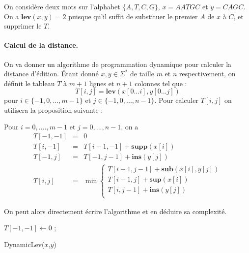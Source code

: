 \begin{example}[ADN]
On considère deux mots sur l'alphabet $\{A,T,C,G\}$, $x=AATGC$ et $y=CAGC$. On a $\mathbf{lev}(x,y)=2$ puisque qu'il suffit de substituer le premier $A$ de $x$ à $C$, et supprimer le $T$.
\end{example}


\paragraph{Calcul de la distance.}

On va donner un algorithme de programmation dynamique pour calculer la distance d'édition. Étant donné $x,y \in \Sigma^*$ de taille $m$ et $n$ respectivement, on définit le tableau $T$ à $m+1$ lignes et $n+1$ colonnes tel que :
$$
T[i,j] = \mathbf{lev}(x[0...i],y[0...j])
$$
pour $i \in \{-1,0,...,m-1\}$ et $j\in\{-1,0,...,n-1\}$. Pour calculer $T[i,j]$ on utilisera la proposition suivante :

\begin{proposition}\label{prop1}
Pour $i=0,....,m-1$ et $j=0,...,n-1$, on a 
$$
\begin{array}{lll}
T[-1,-1] &= &0  \\
T[i,-1] &= &T[i-1,-1] + \mathbf{supp}(x[i]) \\
T[-1,j] &= &T[-1,j-1] + \mathbf{ins}(y[j]) \\
T[i,j] &= &\min \left\lbrace 
\begin{array}{l}
T[i-1,j-1] + \mathbf{sub}(x[i],y[j]) \\
T[i-1,j] + \mathbf{sup}(x[i]) \\
T[i,j-1] + \mathbf{ins}(y[j]) \\
\end{array}
\right.
\end{array}
$$
\end{proposition}


On peut alors directement écrire l'algorithme et en déduire sa complexité.

\begin{algorithm}
$T[-1,-1] \leftarrow 0$ ;\\
\caption{DynamicLev($x$,$y$)}
\end{algorithm}

